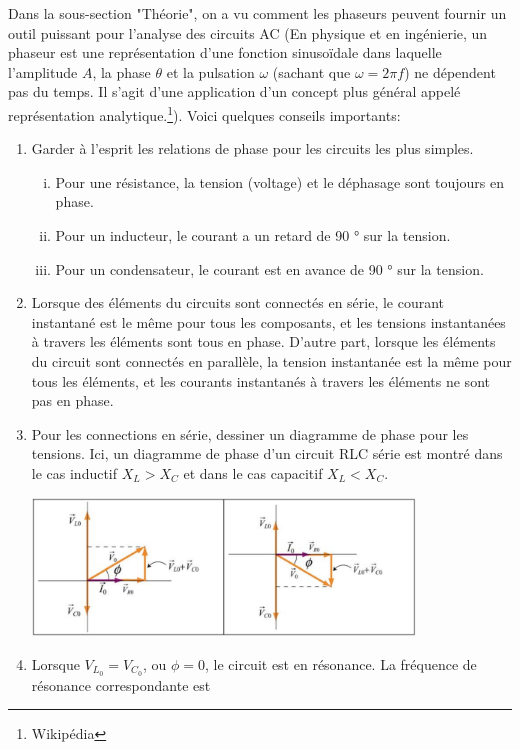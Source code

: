 \documentclass[a4paper]{article}
\begin{document}
Dans la sous-section "Théorie", on a vu comment les phaseurs peuvent fournir un outil puissant pour l'analyse des circuits AC \Big(En physique et en ingénierie, un phaseur est une représentation d'une fonction sinusoïdale dans laquelle l'amplitude $ A $, la phase $ \theta $ et la pulsation $ \omega $ (sachant que $ \omega = 2 \pi f $) ne dépendent pas du temps. Il s'agit d'une application d'un concept plus général appelé représentation analytique.\footnote{Wikipédia}\Big). Voici quelques conseils importants: 
\begin{enumerate}
    \item Garder à l'esprit les relations de phase pour les circuits les plus simples.
        \begin{enumerate}[i.]
            \item Pour une résistance, la tension (voltage) et le déphasage sont toujours en phase.
            \item Pour un inducteur, le courant a un retard de 90 ° sur la tension.
            \item Pour un condensateur, le courant est en avance de 90 ° sur la tension.
        \end{enumerate}
    \item Lorsque des éléments du circuits sont connectés en série, le courant instantané est le même pour tous les composants, et les
tensions instantanées à travers les éléments sont tous en phase. D'autre part, lorsque les éléments du circuit sont connectés en parallèle, la tension instantanée est la même pour tous les éléments, et les courants instantanés à travers les éléments ne sont pas en phase.
    \item Pour les connections en série, dessiner un diagramme de phase pour les tensions. Ici, un diagramme de phase d'un circuit RLC 
série est montré dans le cas inductif $ X_L > X_C $ et dans le cas capacitif $ X_L < X_C $.
\begin{center}
\includegraphics[width=0.8\textwidth]{ac3.PNG}
\end{center}
    \item Lorsque $ V_{L_0} = V_{C_0} $, ou $ \phi = 0 $, le circuit est en résonance. La fréquence de résonance correspondante est 

\end{enumerate}
\end{document}
